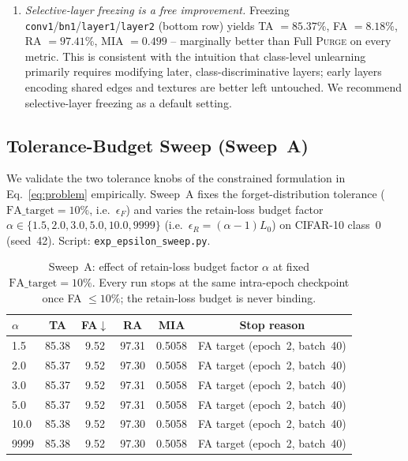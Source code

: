 \documentclass{article}
\newcommand{\ours}{\textsc{Purge}}
\begin{document}
{\begin{enumerate}[nosep,leftmargin=*]
\item \emph{Selective-layer freezing is a free improvement.} Freezing \texttt{conv1}/\texttt{bn1}/\texttt{layer1}/\texttt{layer2} (bottom row) yields TA $= 85.37$\%, FA $= 8.18$\%, RA $= 97.41$\%, MIA $= 0.499$ -- marginally better than Full \ours{} on every metric. This is consistent with the intuition that class-level unlearning primarily requires modifying later, class-discriminative layers; early layers encoding shared edges and textures are better left untouched. We recommend selective-layer freezing as a default setting.
\end{enumerate}

\subsection{Tolerance-Budget Sweep (Sweep~A)}\label{sec:eps_sweep}

We validate the two tolerance knobs of the constrained formulation in Eq.~\ref{eq:problem} empirically. Sweep~A fixes the forget-distribution tolerance ($\mathrm{FA\_target} = 10\%$, i.e.\ $\epsilon_F$) and varies the retain-loss budget factor $\alpha \in \{1.5, 2.0, 3.0, 5.0, 10.0, 9999\}$ (i.e.\ $\epsilon_R = (\alpha - 1)L_0$) on CIFAR-10 class~0 (seed~42). Script: \texttt{exp\_epsilon\_sweep.py}.

\begin{table}[t]
\centering
\small
\begin{tabular}{lccccc}
\toprule
$\alpha$ & \textbf{TA} & \textbf{FA}$\downarrow$ & \textbf{RA} & \textbf{MIA} & \textbf{Stop reason} \\
\midrule
1.5   & 85.38 & 9.52 & 97.31 & 0.5058 & FA target (epoch~2, batch~40) \\
2.0   & 85.37 & 9.52 & 97.30 & 0.5058 & FA target (epoch~2, batch~40) \\
3.0   & 85.37 & 9.52 & 97.31 & 0.5058 & FA target (epoch~2, batch~40) \\
5.0   & 85.37 & 9.52 & 97.31 & 0.5058 & FA target (epoch~2, batch~40) \\
10.0  & 85.38 & 9.52 & 97.30 & 0.5058 & FA target (epoch~2, batch~40) \\
9999  & 85.38 & 9.52 & 97.30 & 0.5058 & FA target (epoch~2, batch~40) \\
\bottomrule
\end{tabular}
\caption{Sweep~A: effect of retain-loss budget factor $\alpha$ at fixed $\mathrm{FA\_target}=10\%$. Every run stops at the same intra-epoch checkpoint once FA $\le 10\%$; the retain-loss budget is never binding.}
\label{tab:eps_sweep_a}
\end{table}

}
\end{document}
